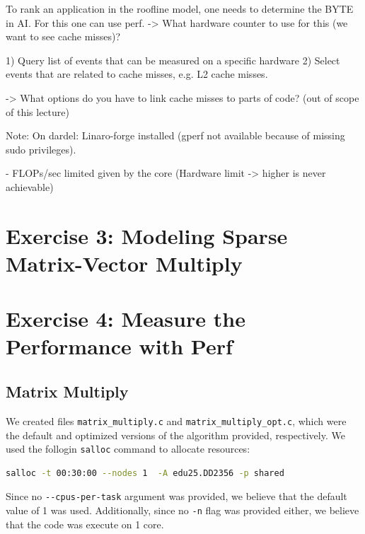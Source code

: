 \documentclass[a4paper,10pt]{article}
\begin{document}
To rank an application in the roofline model, one needs to determine the BYTE in AI.
For this one can use perf.
-> What hardware counter to use for this (we want to see cache misses)?

1) Query list of events that can be measured on a specific hardware
2) Select events that are related to cache misses, e.g. L2 cache misses.

-> What options do you have to link cache misses to parts of code? (out of scope of this lecture)

Note: On dardel: Linaro-forge installed (gperf not available because of missing sudo privileges).

- FLOPs/sec limited given by the core (Hardware limit -> higher is never achievable)

\section{Exercise 3: Modeling Sparse Matrix-Vector Multiply}


\section{Exercise 4: Measure the Performance with Perf}
\subsection{Matrix Multiply}
\label{sec:matrix_multiply}
We created files \verb|matrix_multiply.c| and \verb|matrix_multiply_opt.c|, which were the default and optimized versions of the algorithm provided, respectively. We used the follogin \verb|salloc| command to allocate resources: 

\begin{lstlisting}[language=bash,basicstyle=\ttfamily]
salloc -t 00:30:00 --nodes 1  -A edu25.DD2356 -p shared
\end{lstlisting}
Since no \verb|--cpus-per-task| argument was provided, we believe that the default value of 1 was used. Additionally, since no \verb|-n| flag was provided either, we believe that the code was execute on 1 core. 
\end{document}
